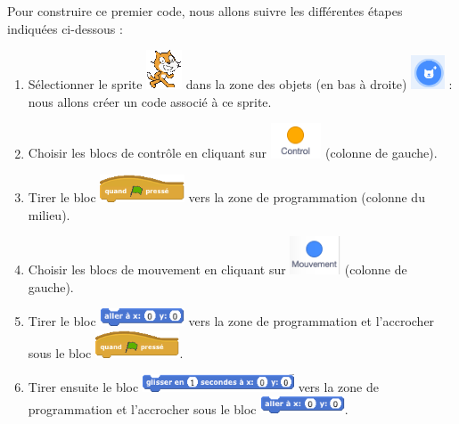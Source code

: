 Pour construire ce premier code, nous allons suivre les différentes étapes indiquées ci-dessous :


\begin{enumerate}
\item Sélectionner le sprite \includegraphics[width=.7cm]{./images/scratch/Lutin} dans la zone des objets (en bas à droite) \includegraphics[width=1cm]{./images/scratch/sprite.png} : nous allons créer un code associé à ce sprite.
\item Choisir les blocs de contrôle en cliquant sur \includegraphics[width=1.5cm]{./images/scratch/control.png} (colonne de gauche).
\item Tirer le bloc \includegraphics[width=2.5cm]{./images/scratch/BlocDrapeauVert} vers la zone de programmation (colonne du milieu).
\item Choisir les blocs de mouvement en cliquant sur \includegraphics[width=1.5cm]{./images/scratch/mouvement.png} (colonne de gauche).
\item Tirer le bloc \includegraphics[width=2.5cm]{./images/scratch/BlocAllerA} vers la zone de programmation et l'accrocher sous le bloc \includegraphics[width=2.5cm]{./images/scratch/BlocDrapeauVert}.
\item Tirer ensuite le bloc \includegraphics[width=4.5cm]{./images/scratch/BlocGlisser} vers la zone de programmation et l'accrocher sous le bloc \includegraphics[width=2.5cm]{./images/scratch/BlocAllerA}.

\end{enumerate}
